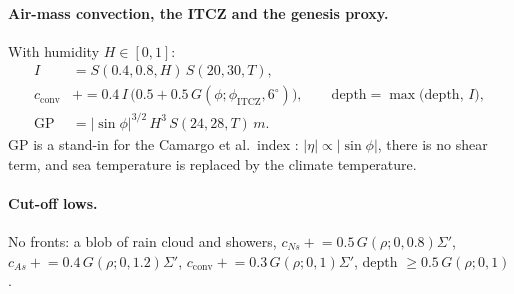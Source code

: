 \documentclass[11pt,a4paper]{article}
\begin{document}
\paragraph{Air-mass convection, the ITCZ and the genesis proxy.} With humidity $H\in[0,1]$:
\begin{align}
  I&=S(0.4,0.8,H)\,S(20,30,T),\\
  c_{\mathrm{conv}}&\mathrel{+}=0.4\,I\,\big(0.5+0.5\,G(\phi;\phi_{\mathrm{ITCZ}},6^\circ)\big),\qquad
  \mathrm{depth}=\max\big(\mathrm{depth},\,I\big),\\
  \mathrm{GP}&=\big|\sin\phi\big|^{3/2}\,H^3\,S(24,28,T)\,m.
\end{align}
GP is a stand-in for the Camargo et al.\ index \cite{camargo2007}: $|\eta|\propto|\sin\phi|$,
there is no shear term, and sea temperature is replaced by the climate temperature.

\paragraph{Cut-off lows.} No fronts: a blob of rain cloud and showers,
$c_{Ns}\mathrel{+}=0.5\,G(\rho;0,0.8)\Sigma'$, $c_{As}\mathrel{+}=0.4\,G(\rho;0,1.2)\Sigma'$,
$c_{\mathrm{conv}}\mathrel{+}=0.3\,G(\rho;0,1)\Sigma'$, depth $\ge0.5\,G(\rho;0,1)$.
\end{document}

